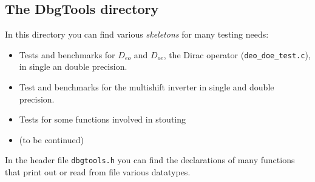 \subsection{The DbgTools directory}
In this directory you can find various \emph{skeletons} for many testing needs:
\begin{itemize}
    \item Tests and benchmarks for $D_{eo}$ and $D_{oe}$, the Dirac 
        operator (\verb|deo_doe_test.c|), in single an double precision.
    \item Test and benchmarks for the multishift inverter in single and double 
precision.
    \item Tests for some functions involved in stouting
    \item (to be continued)
\end{itemize}
In the header file \verb|dbgtools.h| you can find the declarations of many 
functions that print out or read from file various datatypes.


